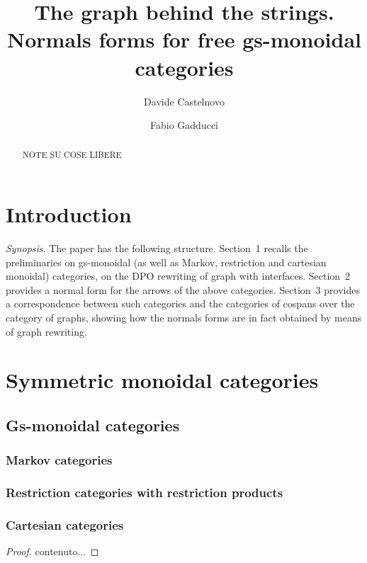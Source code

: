 \documentclass[a4paper,UKenglish,cleveref,pdftex,thm-restate,numberwithinsect]{lipics-v2021}
\author{Davide Castelnovo}
{Department of Computer Science, University of Pisa, Italy}
{castelnovod@gmail.com}
{https://orcid.org/0000-0002-5926-5615}{}
\author{Fabio Gadducci}
{Department of Computer Science, University of Pisa, Italy}
{fabio.gadducci@unipi.it}
{https://orcid.org/0000-0003-0690-3051}{}
\title{The graph behind the strings.\\ Normals forms for free gs-monoidal categories}
\begin{document}
	\maketitle
\begin{abstract}
NOTE SU COSE LIBERE
\end{abstract}	

\tableofcontents
\section{Introduction}

\emph{Synopsis}. The paper has the following structure. Section~1 recalls the preliminaries on gs-monoidal  (as well as Markov, restriction and cartesian monoidal) categories,
on the DPO rewriting of graph with interfaces. Section~2 provides a normal form for the arrows of the above categories. Section~3 provides a correspondence between 
such categories and the categories of cospans over the category of graphs, showing how the normals forms are in fact obtained by means of graph rewriting.

\section{Symmetric monoidal categories}
\subsection{Gs-monoidal categories}
\subsubsection{Markov categories}


\subsubsection{Restriction categories with restriction products}


\subsubsection{Cartesian categories}

\begin{theorem}
	
\end{theorem}

\begin{proof}
	contenuto...
\end{proof}
\end{document}
